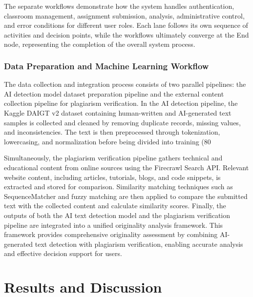 \documentclass[12pt, a4paper]{report}
\numberwithin{equation}{chapter}
\begin{document}
The separate workflows demonstrate how the system handles authentication, classroom management, assignment submission, analysis, administrative control, and error conditions for different user roles. Each lane follows its own sequence of activities and decision points, while the workflows ultimately converge at the End node, representing the completion of the overall system process.

\subsection{Data Preparation and Machine Learning Workflow}

The data collection and integration process consists of two parallel pipelines: the AI detection model dataset preparation pipeline and the external content collection pipeline for plagiarism verification. In the AI detection pipeline, the Kaggle DAIGT v2 dataset containing human-written and AI-generated text samples is collected and cleaned by removing duplicate records, missing values, and inconsistencies. The text is then preprocessed through tokenization, lowercasing, and normalization before being divided into training (80%

Simultaneously, the plagiarism verification pipeline gathers technical and educational content from online sources using the Firecrawl Search API. Relevant website content, including articles, tutorials, blogs, and code snippets, is extracted and stored for comparison. Similarity matching techniques such as SequenceMatcher and fuzzy matching are then applied to compare the submitted text with the collected content and calculate similarity scores. Finally, the outputs of both the AI text detection model and the plagiarism verification pipeline are integrated into a unified originality analysis framework. This framework provides comprehensive originality assessment by combining AI-generated text detection with plagiarism verification, enabling accurate analysis and effective decision support for users.


\chapter{Results and Discussion}
\end{document}
